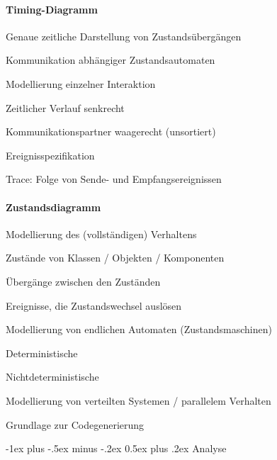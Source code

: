 \documentclass[a4paper]{article}
\makeatletter
\renewcommand{\section}{\@startsection{section}{1}{0mm}%
                                {-1ex plus -.5ex minus -.2ex}%
                                {0.5ex plus .2ex}%
                                {\normalfont\large\bfseries}}
\makeatother
\begin{document}
\begin{multicols}{3}
  \paragraph{Timing-Diagramm}
  \begin{itemize*}
    \item Genaue zeitliche Darstellung von Zustandsübergängen
    \item Kommunikation abhängiger Zustandsautomaten
    \item Modellierung einzelner Interaktion
    \item Zeitlicher Verlauf senkrecht
    \item Kommunikationspartner waagerecht (unsortiert)
    \item Ereignisspezifikation
    \item Trace: Folge von Sende- und Empfangsereignissen
  \end{itemize*}

  \paragraph{Zustandsdiagramm}
  \begin{itemize*}
    \item Modellierung des (vollständigen) Verhaltens
    \begin{itemize*}
      \item Zustände von Klassen / Objekten / Komponenten
      \item Übergänge zwischen den Zuständen
      \item Ereignisse, die Zustandswechsel auslösen
    \end{itemize*}
    \item Modellierung von endlichen Automaten (Zustandsmaschinen)
    \begin{itemize*}
      \item Deterministische
      \item Nichtdeterministische
    \end{itemize*}
    \item Modellierung von verteilten Systemen / parallelem Verhalten
    \item Grundlage zur Codegenerierung
  \end{itemize*}

  \newpage
  \section{Analyse}


\end{multicols}
\end{document}
